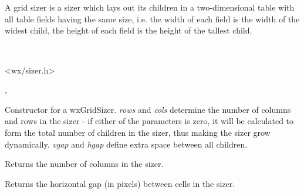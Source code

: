 \section{}\label{wxgridsizer}

A grid sizer is a sizer which lays out its children in a two-dimensional
table with all table fields having the same size,
i.e. the width of each field is the width of the widest child,
the height of each field is the height of the tallest child.


\\


<wx/sizer.h>




, 

\label{wxgridsizerwxgridsizer}



Constructor for a wxGridSizer. {\it rows} and {\it cols} determine the number of
columns and rows in the sizer - if either of the parameters is zero, it will be
calculated to form the total number of children in the sizer, thus making the
sizer grow dynamically. {\it vgap} and {\it hgap} define extra space between
all children.

\label{wxgridsizergetcols}


Returns the number of columns in the sizer.


\label{wxgridsizergethgap}


Returns the horizontal gap (in pixels) between cells in the sizer.


\label{wxgridsizergetrows}


